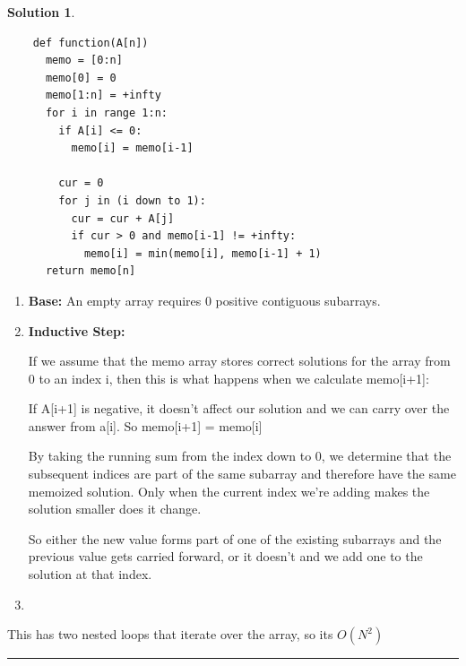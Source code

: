 \documentclass{article}
\theoremstyle{definition}
\def\fline{\rule{0.75\linewidth}{0.5pt}}
\newcommand{\finishline}{
  \begin{center}\fline
\end{center}}
\newtheorem*{solution*}{Solution}
\newenvironment{solution}{
\begin{solution*}}{{\finishline}
\end{solution*}}
\begin{document}
\begin{solution}

  \
  
  \begin{verbatim}
    def function(A[n])
      memo = [0:n]
      memo[0] = 0
      memo[1:n] = +infty
      for i in range 1:n:
        if A[i] <= 0:
          memo[i] = memo[i-1]
      
        cur = 0 
        for j in (i down to 1):
          cur = cur + A[j]
          if cur > 0 and memo[i-1] != +infty:
            memo[i] = min(memo[i], memo[i-1] + 1)
      return memo[n] 
  \end{verbatim}

  \begin{enumerate}
    \item \textbf{Base: } An empty array requires 0 positive contiguous subarrays. 
    \item \textbf{Inductive Step: } 
    \

    If we assume that the memo array stores correct solutions for the array from 0 to an index i, then this is what happens when we calculate memo[i+1]:
    \

    If A[i+1] is negative, it doesn't affect our solution and we can carry over the answer from a[i]. So memo[i+1] = memo[i]

    By taking the running sum from the index down to 0, we determine that the subsequent indices are part of the same subarray and therefore have the same memoized solution. Only when the current index we're adding makes the solution smaller does it change. 

    So either the new value forms part of one of the existing subarrays and the previous value gets carried forward, or it doesn't and we add one to the solution at that index.
    \
    \item  
  \end{enumerate}

  This has two nested loops that iterate over the array, so its $O(N^2)$

\end{solution}
\end{document}
